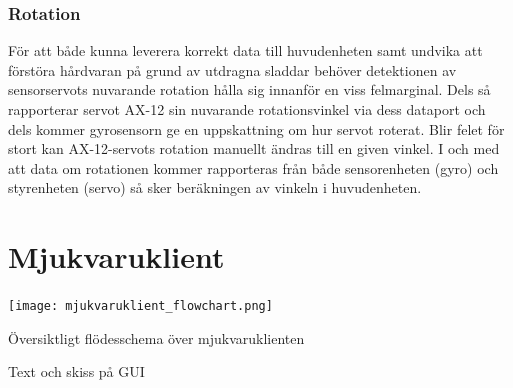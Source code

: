 \documentclass{article}
\begin{document}
\subsubsection{Rotation}
För att både kunna leverera korrekt data till huvudenheten samt undvika att förstöra hårdvaran på grund av utdragna sladdar behöver detektionen av sensorservots nuvarande rotation hålla sig innanför en viss felmarginal. Dels så rapporterar servot AX-12 sin nuvarande rotationsvinkel via dess dataport och dels kommer gyrosensorn ge en uppskattning om hur servot roterat. Blir felet för stort kan AX-12-servots rotation manuellt ändras till en given vinkel. I och med att data om rotationen kommer rapporteras från både sensorenheten (gyro) och styrenheten (servo) så sker beräkningen av vinkeln i huvudenheten.

\section{Mjukvaruklient}
\texttt{[image: mjukvaruklient\_flowchart.png]}
\caption{Översiktligt flödesschema över mjukvaruklienten}
Text och skiss på GUI
\end{document}
